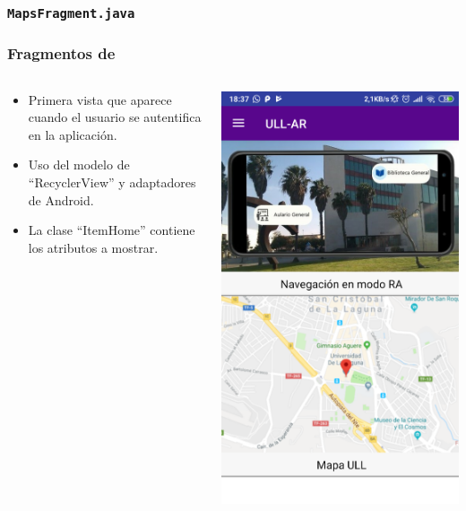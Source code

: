\begin{frame}
	\frametitle{\texttt{MapsFragment.java}}
	
\end{frame}



% 	

\begin{frame}
	\frametitle{Fragmentos de \ULLAR{}}
	\begin{columns}
		\begin{column}{0.6\textwidth}
			\begin{itemize}
				\item Primera vista que aparece cuando el usuario se autentifica en la aplicación.
				\item Uso del modelo de ``RecyclerView'' y adaptadores de Android.
				\item La clase ``ItemHome'' contiene los atributos a mostrar.
			\end{itemize}
			\endblock{}
		\end{column}
		\begin{column}{0.4\textwidth} 
			\vfill 
			\begin{center}
				\includegraphics[width=0.8\linewidth]{Images/homeApp}
			\end{center}
		\end{column}
	\end{columns}
\end{frame}

